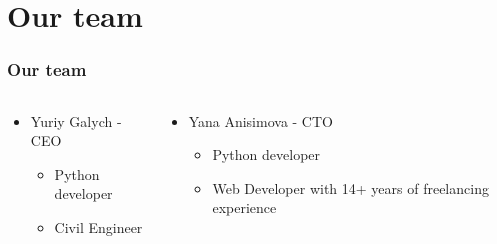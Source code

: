 \documentclass{beamer}
\begin{document}
\section{Our team}

\begin{frame}
    \frametitle{Our team}
    
    \begin{columns}
         
        \begin{column}{0.5\textwidth}
            \vspace{1cm}
            \begin{itemize}
                \item Yuriy Galych - CEO
                \begin{itemize}
                    \item Python developer
                    \item Civil Engineer
                \end{itemize}
            \end{itemize}
        \end{column}
        
        \begin{column}{0.5\textwidth}
            \vspace{1cm}
            \begin{itemize}
                \item Yana Anisimova - CTO
                \begin{itemize}
                    \item Python developer
                    \item Web Developer with 14+ years of freelancing experience
                \end{itemize}
            \end{itemize}
        \end{column}

    \end{columns}
    
\end{frame}
\end{document}
